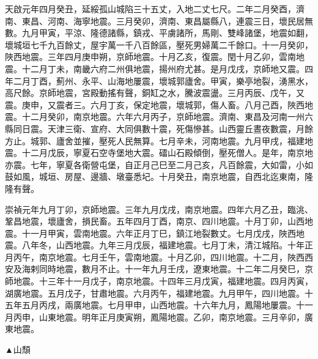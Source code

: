 \begin{pinyinscope}
天啟元年四月癸丑，延綏孤山城陷三十五丈，入地二丈七尺。二年二月癸酉，濟南、東昌、河南、海寧地震。三月癸卯，濟南、東昌屬縣八，連震三日，壞民居無數。九月甲寅，平涼、隆德諸縣，鎮戎、平虜諸所，馬剛、雙峰諸堡，地震如翻，壞城垣七千九百餘丈，屋宇萬一千八百餘區，壓死男婦萬二千餘口。十一月癸卯，陜西地震。三年四月庚申朔，京師地震。十月乙亥，復震。閏十月乙卯，雲南地震。十二月丁未，南畿六府二州俱地震，揚州府尤甚。是月戊戌，京師地又震。四年二月丁酉，薊州、永平、山海地屢震，壞城郭廬舍。甲寅，樂亭地裂，湧黑水，高尺餘。京師地震，宮殿動搖有聲，銅缸之水，騰波震盪。三月丙辰、戊午，又震。庚申，又震者三。六月丁亥，保定地震，壞城郭，傷人畜。八月己酉，陜西地震。十二月癸卯，南京地震。六年六月丙子，京師地震。濟南、東昌及河南一州六縣同日震。天津三衛、宣府、大同俱數十震，死傷慘甚。山西靈丘晝夜數震，月餘方止。城郭、廬舍並摧，壓死人民無算。七月辛未，河南地震。九月甲戌，福建地震。十二月戊辰，寧夏石空寺堡地大震。礌山石殿傾倒，壓死僧人。是年，南京地亦震。七年，寧夏各衛營屯堡，自正月己巳至二月己亥，凡百餘震，大如雷，小如鼓如風，城垣、房屋、邊牆、墩臺悉圮。十月癸丑，南京地震，自西北迄東南，隆隆有聲。

崇禎元年九月丁卯，京師地震。三年九月戊戌，南京地震。四年六月乙丑，臨洮、鞏昌地震，壞廬舍，損民畜。五年四月丁酉，南京、四川地震。十月丁卯，山西地震。十一月甲寅，雲南地震。六年正月丁巳，鎮江地裂數丈。七月戊戌，陜西地震。八年冬，山西地震。九年三月戊辰，福建地震。七月丁未，清江城陷。十年正月丙午，南京地震。七月壬午，雲南地震。十月乙卯，四川地震。十二月，陜西西安及海剌同時地震，數月不止。十一年九月壬戌，遼東地震。十二年二月癸巳，京師地震。十三年十一月戊子，南京地震。十四年三月戊寅，福建地震。四月丙寅，湖廣地震。五月戊子，甘肅地震。六月丙午，福建地震。九月甲午，四川地震。十五年五月丙戌，兩廣地震。七月甲申，山西地震。十六年九月，鳳陽地屢震。十一月丙申，山東地震。明年正月庚寅朔，鳳陽地震。乙卯，南京地震。三月辛卯，廣東地震。

▲山頹


\end{pinyinscope}

